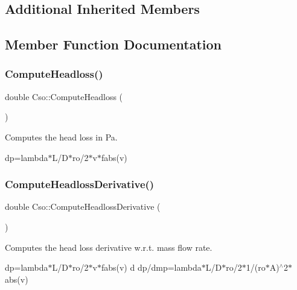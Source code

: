 \subsection*{Additional Inherited Members}


\subsection{Member Function Documentation}
\hypertarget{class_cso_a796d4ff0f69732001c91abe7e5ce7ed7}{}\label{class_cso_a796d4ff0f69732001c91abe7e5ce7ed7} 
\subsubsection{\texorpdfstring{Compute\+Headloss()}{ComputeHeadloss()}}
{\footnotesize\ttfamily double Cso\+::\+Compute\+Headloss (\begin{DoxyParamCaption}{ }\end{DoxyParamCaption})}



Computes the head loss in Pa. 

dp\textquotesingle{}=lambda$\ast$\+L/\+D$\ast$ro/2$\ast$v$\ast$fabs(v) \hypertarget{class_cso_a5f8536643bc971ca70aebef850fa53a1}{}\label{class_cso_a5f8536643bc971ca70aebef850fa53a1} 
\subsubsection{\texorpdfstring{Compute\+Headloss\+Derivative()}{ComputeHeadlossDerivative()}}
{\footnotesize\ttfamily double Cso\+::\+Compute\+Headloss\+Derivative (\begin{DoxyParamCaption}{ }\end{DoxyParamCaption})}



Computes the head loss derivative w.\+r.\+t. mass flow rate. 

dp\textquotesingle{}=lambda$\ast$\+L/\+D$\ast$ro/2$\ast$v$\ast$fabs(v) d dp\textquotesingle{}/dmp=lambda$\ast$\+L/\+D$\ast$ro/2$\ast$1/(ro$\ast$A)$^\wedge$2$\ast$abs(v) \hypertarget{class_cso_a113196b16e49417924fea36b770f4d84}{}\label{class_cso_a113196b16e49417924fea36b770f4d84} 
